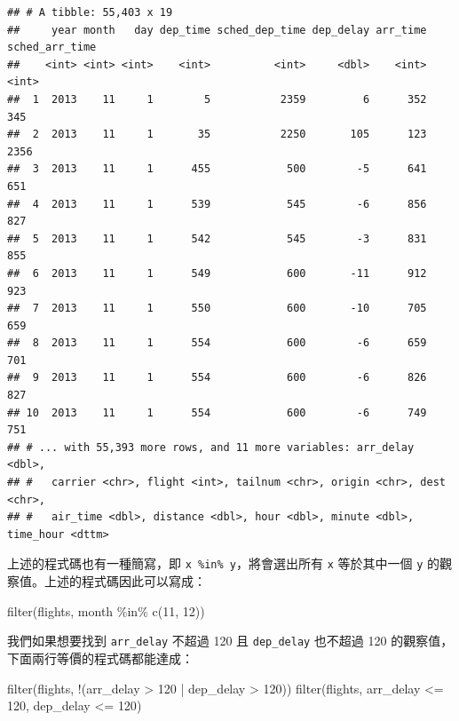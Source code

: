 \documentclass[
]{book}
\newenvironment{Shaded}{\begin{snugshade}}{\end{snugshade}}
\newcommand{\DecValTok}[1]{\textcolor[rgb]{0.00,0.00,0.81}{#1}}
\newcommand{\FunctionTok}[1]{\textcolor[rgb]{0.00,0.00,0.00}{#1}}
\newcommand{\NormalTok}[1]{#1}
\newcommand{\SpecialCharTok}[1]{\textcolor[rgb]{0.00,0.00,0.00}{#1}}
\theoremstyle{definition}
\theoremstyle{remark}
\begin{document}
\begin{verbatim}
## # A tibble: 55,403 x 19
##     year month   day dep_time sched_dep_time dep_delay arr_time sched_arr_time
##    <int> <int> <int>    <int>          <int>     <dbl>    <int>          <int>
##  1  2013    11     1        5           2359         6      352            345
##  2  2013    11     1       35           2250       105      123           2356
##  3  2013    11     1      455            500        -5      641            651
##  4  2013    11     1      539            545        -6      856            827
##  5  2013    11     1      542            545        -3      831            855
##  6  2013    11     1      549            600       -11      912            923
##  7  2013    11     1      550            600       -10      705            659
##  8  2013    11     1      554            600        -6      659            701
##  9  2013    11     1      554            600        -6      826            827
## 10  2013    11     1      554            600        -6      749            751
## # ... with 55,393 more rows, and 11 more variables: arr_delay <dbl>,
## #   carrier <chr>, flight <int>, tailnum <chr>, origin <chr>, dest <chr>,
## #   air_time <dbl>, distance <dbl>, hour <dbl>, minute <dbl>, time_hour <dttm>
\end{verbatim}

上述的程式碼也有一種簡寫，即 \texttt{x\ \%in\%\ y}，將會選出所有 \texttt{x} 等於其中一個 \texttt{y} 的觀察值。上述的程式碼因此可以寫成：

\begin{Shaded}
\begin{Highlighting}[]
\FunctionTok{filter}\NormalTok{(flights, month }\SpecialCharTok{\%in\%} \FunctionTok{c}\NormalTok{(}\DecValTok{11}\NormalTok{, }\DecValTok{12}\NormalTok{))}
\end{Highlighting}
\end{Shaded}

我們如果想要找到 \texttt{arr\_delay} 不超過 120 且 \texttt{dep\_delay} 也不超過 120 的觀察值，下面兩行等價的程式碼都能達成：

\begin{Shaded}
\begin{Highlighting}[]
\FunctionTok{filter}\NormalTok{(flights, }\SpecialCharTok{!}\NormalTok{(arr\_delay }\SpecialCharTok{\textgreater{}} \DecValTok{120} \SpecialCharTok{|}\NormalTok{ dep\_delay }\SpecialCharTok{\textgreater{}} \DecValTok{120}\NormalTok{))}
\FunctionTok{filter}\NormalTok{(flights, arr\_delay }\SpecialCharTok{\textless{}=} \DecValTok{120}\NormalTok{, dep\_delay }\SpecialCharTok{\textless{}=} \DecValTok{120}\NormalTok{)}
\end{Highlighting}
\end{Shaded}
\end{document}
